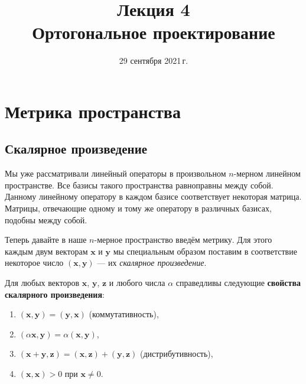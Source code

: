 \documentclass[11pt,a4paper]{article}
\title{Лекция 4 \\
    Ортогональное проектирование
    }
\date{29 сентября 2021\,г.}
\providecommand{\tightlist}{%
      \setlength{\itemsep}{0pt}\setlength{\parskip}{0pt}}
\begin{document}
    
\maketitle
\thispagestyle{empty}
\tableofcontents
\pagebreak
    
    




    \hypertarget{ux43cux435ux442ux440ux438ux43aux430-ux43fux440ux43eux441ux442ux440ux430ux43dux441ux442ux432ux430}{%
\section{Метрика
пространства}\label{ux43cux435ux442ux440ux438ux43aux430-ux43fux440ux43eux441ux442ux440ux430ux43dux441ux442ux432ux430}}

\hypertarget{ux441ux43aux430ux43bux44fux440ux43dux43eux435-ux43fux440ux43eux438ux437ux432ux435ux434ux435ux43dux438ux435}{%
\subsection{Скалярное
произведение}\label{ux441ux43aux430ux43bux44fux440ux43dux43eux435-ux43fux440ux43eux438ux437ux432ux435ux434ux435ux43dux438ux435}}

Мы уже рассматривали линейный операторы в произвольном \(n\)-мерном
линейном пространстве. Все базисы такого пространства равноправны между
собой. Данному линейному оператору в каждом базисе соответствует
некоторая матрица. Матрицы, отвечающие одному и тому же оператору в
различных базисах, подобны между собой.

Теперь давайте в наше \(n\)-мерное пространство введём метрику. Для
этого каждым двум векторам \(\mathbf{x}\) и \(\mathbf{y}\) мы
специальным образом поставим в соответствие некоторое число
\((\mathbf{x}, \mathbf{y})\) --- их \emph{скалярное произведение}.

Для любых векторов \(\mathbf{x}\), \(\mathbf{y}\), \(\mathbf{z}\) и
любого числа \(\alpha\) справедливы следующие \textbf{свойства
скалярного произведения}:

\begin{enumerate}
\def\labelenumi{\arabic{enumi}.}
\tightlist
\item
  \((\mathbf{x}, \mathbf{y}) = (\mathbf{y}, \mathbf{x})\)
  (коммутативность),
\item
  \((\alpha \mathbf{x}, \mathbf{y}) = \alpha (\mathbf{x}, \mathbf{y})\),
\item
  \((\mathbf{x} + \mathbf{y}, \mathbf{z}) = (\mathbf{x}, \mathbf{z}) + (\mathbf{y}, \mathbf{z})\)
  (дистрибутивность),
\item
  \((\mathbf{x}, \mathbf{x}) > 0\) при \(\mathbf{x} \ne 0\).
\end{enumerate}
\end{document}
